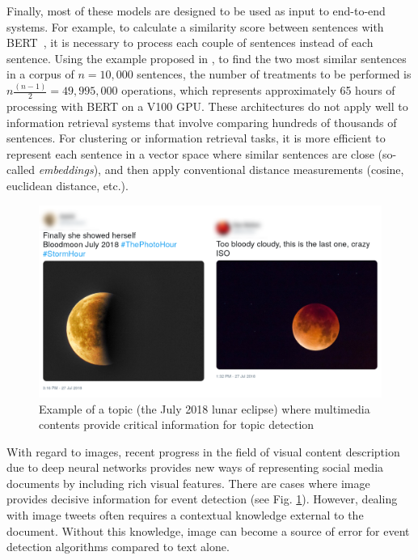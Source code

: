 Finally, most of these models are designed to be used as input to
end-to-end systems. For example, to calculate a similarity score between sentences
with BERT~\citep{devlin2018bert}, it is necessary to process each couple of sentences instead of each sentence. Using the example proposed in \citep{reimers_2019_sentence}, to find the two most similar sentences in a corpus of $n = 10,000$ sentences, the number of treatments to be performed is $n\frac{(n - 1)}{2} = 49,995,000$ operations, which represents approximately 65 hours of processing with BERT on a V100 GPU.
These architectures do not apply well to information retrieval systems that involve comparing
hundreds of thousands of sentences. For clustering or information retrieval tasks, 
it is more efficient to represent each sentence in a vector space where similar sentences
 are close (so-called \textit{embeddings}), and then apply conventional distance measurements 
 (cosine, euclidean distance, etc.).
 
 \begin{figure}
  \includegraphics[width=\textwidth]{figures/Moon_horizontal.png}
    \caption{Example of a topic (the July 2018 lunar eclipse) where multimedia contents provide critical information for topic detection}
    \label{fig:moon}
\end{figure}
 
 With regard to images, recent progress in the field of visual content description due to deep neural networks provides new ways of representing social media documents by including rich visual features. There are cases where image provides decisive information for event detection (see Fig. \ref{fig:moon}). However, dealing with image tweets often requires a contextual knowledge external to the document. Without this knowledge, image can become a source of error for event detection algorithms compared to text alone.
 
